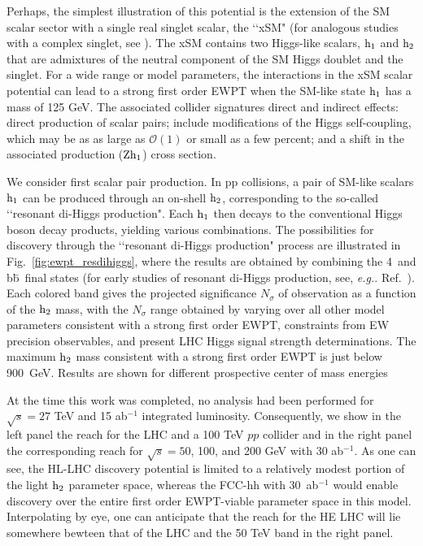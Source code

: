 Perhaps, the simplest illustration of this potential is the extension of the SM scalar sector with a single real singlet scalar\cite{Espinosa:1993bs,Choi:1993cv,Ham:2004cf,Profumo:2007wc,Cline:2012hg,Espinosa:2011ax,No:2013wsa,Curtin:2014jma,Kotwal:2016tex,Brauner:2016fla,Huang:2016cjm,Chen:2017qcz,Huang:2017jws}, the \lq\lq xSM" \cite{Barger:2007im} (for analogous studies with a complex singlet, see \cite{Jiang:2015cwa,Chiang:2017nmu}). 
The xSM contains two Higgs-like scalars, $\rm h_{1}$ and $\rm h_{2}$ that are admixtures of the neutral component of the SM Higgs doublet and the singlet. For a wide range or model parameters, the interactions in the xSM scalar potential can  lead to a strong first order EWPT when the SM-like state $\rm h_1$ has a mass of 125 GeV. The associated collider signatures direct and indirect effects:  direct production of scalar pairs; include modifications of the Higgs self-coupling, which may be as as large as $\mathcal{O}(1)$ or small as a few percent; and a shift in the associated production ($\rm Zh_1$) cross section. 

We consider first scalar pair production. In pp collisions, a pair of SM-like scalars $\rm h_1$ can be produced through an on-shell $\rm h_2$, corresponding to the so-called \lq\lq resonant di-Higgs production".  Each $\rm h_1$ then decays to the conventional Higgs boson decay products, yielding various combinations. The possibilities for discovery through the  \lq\lq resonant di-Higgs production" process are illustrated in Fig.~\ref{fig:ewpt_resdihiggs}, where the results are obtained by combining the 4\texttau\ and b\={b}\textgamma\textgamma\ final states\cite{Kotwal:2016tex} (for early studies of resonant di-Higgs production, see, {\it e.g.}. Ref.~\cite{Baur:2003gp}). Each colored band gives the projected significance $N_\sigma$ of observation as a function of the $\rm h_2$ mass, with the $N_\sigma$ range obtained by varying over all other model parameters consistent with a strong first order EWPT, constraints from EW precision observables, and present LHC Higgs signal strength determinations.  The maximum $\rm h_2$ mass consistent with a strong first order EWPT is just below 900~GeV.  Results are shown for different prospective center of mass energies

At the time this work was completed, no analysis had been performed for $\sqrt{s} = 27 $ TeV and 15 ab$^{-1}$ integrated luminosity. Consequently, we show in the left panel the reach for the LHC and a 100 TeV $pp$ collider and in the right panel the corresponding reach for $\sqrt{s} = 50$, 100, and 200 GeV with 30 ab$^{-1}$. As one can see, the HL-LHC discovery potential is limited to a relatively modest portion of the light $\rm h_2$ parameter space, whereas the FCC-hh with 30~ab$^{-1}$ would enable discovery over the entire first order EWPT-viable parameter space in this model. Interpolating by eye, one can anticipate that the reach for the HE LHC will lie somewhere bewteen that of the LHC and the 50 TeV band in the right panel. 

